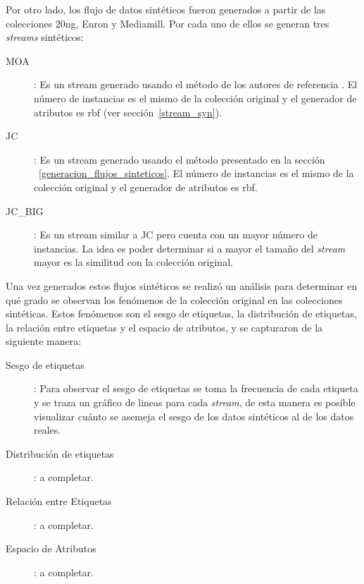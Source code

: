Por otro lado, los flujo de datos sintéticos fueron generados a partir de las
colecciones 20ng, Enron y Mediamill. Por cada uno de ellos se generan tres
\textit{streams} sintéticos:

\begin{description}

	\item[MOA]: Es un stream generado usando el método de los autores de
	      referencia \cite{read_generating_2009}. El número de instancias es el
	      mismo de la colección original y el generador de atributos es
	      \acrfull{rbf} (ver sección~\ref{stream_syn}).

	\item[JC]: Es un stream generado usando el método presentado en la sección
	      ~\ref{generacion_flujos_sinteticos}. El número de instancias es el
	      mismo de la colección original y el generador de atributos es
	      \acrfull{rbf}.

	\item[JC\_BIG]: Es un stream similar a JC pero cuenta con un mayor número de
	      instancias. La idea es poder determinar si a mayor el tamaño del
	      \textit{stream} mayor es la similitud con la colección original.

\end{description}

Una vez generados estos flujos sintéticos se realizó un análisis para determinar
en qué grado se observan los fenómenos de la colección original en las
colecciones sintéticas. Estos fenómenos son el sesgo de etiquetas, la
distribución de etiquetas, la relación entre etiquetas y el espacio de
atributos, y se capturaron de la siguiente manera:

\begin{description}

	\item[Sesgo de etiquetas]: Para observar el sesgo de etiquetas se toma la frecuencia de
	      cada etiqueta y se traza un gráfico de lineas para cada \textit{stream}, de esta
	      manera es posible visualizar cuánto se asemeja el sesgo de los datos sintéticos
	      al de los datos reales.

	\item[Distribución de etiquetas]: a completar.

	\item[Relación entre Etiquetas]: a completar.

	\item[Espacio de Atributos]: a completar.

\end{description}



